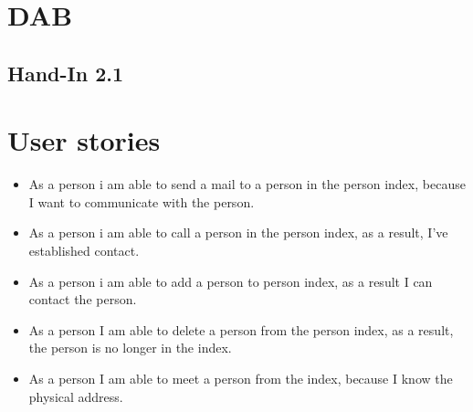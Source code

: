 \documentclass{article}
\begin{document}
\section{DAB}
\subsection{Hand-In 2.1}

\newpage

\section{User stories}

\begin{itemize}
	\item As a person i am able to send a mail to a person in the person index, because I want to communicate with the person.
	\item As a person i am able to call a person in the person index, as a result, I've established contact.
	\item As a person i am able to add a person to person index, as a result I can contact the person.
	\item As a person I am able to delete a person from the person index, as a result, the person is no longer in the index.
	\item As a person I am able to meet a person from the index, because I know the physical address.
\end{itemize}
\end{document}

